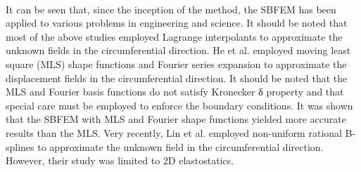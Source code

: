 \paragraph{}
It can be seen that, since the inception of the method, the SBFEM has been applied to various problems in engineering and science.
It should be noted that most of the above studies employed Lagrange interpolants to approximate the unknown fields in the circumferential direction. He et al.
\cite{HE201228,HE2014152} employed moving least square (MLS) shape functions and Fourier series expansion to approximate the displacement fields in the circumferential direction.
It should be noted that the MLS and Fourier basis functions do not satisfy Kronecker δ property and that special care must be employed to enforce the boundary conditions.
It was shown that the SBFEM with MLS and Fourier shape functions yielded more accurate results than the MLS.
Very recently, Lin et al.\cite{Lin2014} employed non-uniform rational B-splines to approximate the unknown field in the circumferential direction.
However, their study was limited to 2D elastostatics.
